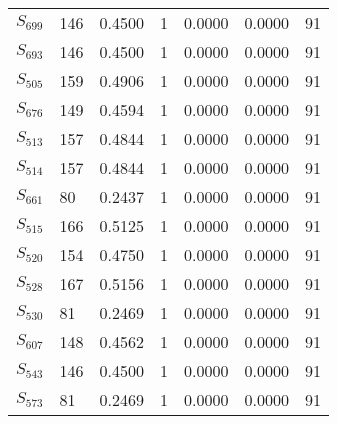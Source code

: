 \begin{xltabular}{\textwidth}{XXXXXXX}
  $S_{699}$ & 146 & 0.4500 & 1 & 0.0000 & 0.0000 & 91 \\ 
  $S_{693}$ & 146 & 0.4500 & 1 & 0.0000 & 0.0000 & 91 \\ 
  $S_{505}$ & 159 & 0.4906 & 1 & 0.0000 & 0.0000 & 91 \\ 
  $S_{676}$ & 149 & 0.4594 & 1 & 0.0000 & 0.0000 & 91 \\ 
  $S_{513}$ & 157 & 0.4844 & 1 & 0.0000 & 0.0000 & 91 \\ 
  $S_{514}$ & 157 & 0.4844 & 1 & 0.0000 & 0.0000 & 91 \\ 
  $S_{661}$ & 80 & 0.2437 & 1 & 0.0000 & 0.0000 & 91 \\ 
  $S_{515}$ & 166 & 0.5125 & 1 & 0.0000 & 0.0000 & 91 \\ 
  $S_{520}$ & 154 & 0.4750 & 1 & 0.0000 & 0.0000 & 91 \\ 
  $S_{528}$ & 167 & 0.5156 & 1 & 0.0000 & 0.0000 & 91 \\ 
  $S_{530}$ & 81 & 0.2469 & 1 & 0.0000 & 0.0000 & 91 \\ 
  $S_{607}$ & 148 & 0.4562 & 1 & 0.0000 & 0.0000 & 91 \\ 
  $S_{543}$ & 146 & 0.4500 & 1 & 0.0000 & 0.0000 & 91 \\ 
  $S_{573}$ & 81 & 0.2469 & 1 & 0.0000 & 0.0000 & 91 \\
        \bottomrule
    \end{xltabular}
    